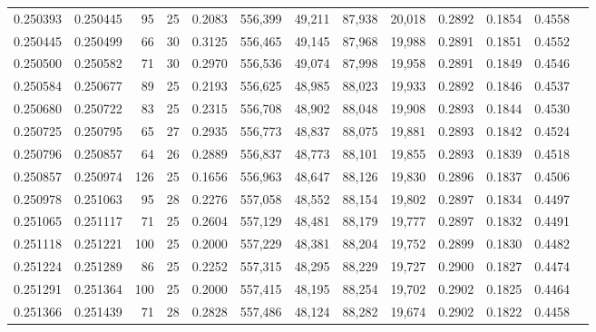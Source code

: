 \begin{tabular}{rrrrrrrrrrrrr}
0.250393 & 0.250445 &  95 &  25 &                                     0.2083 & 556,399 &  49,211 &  87,938 &  20,018 & 0.2892 & 0.1854 & 0.4558 \\
0.250445 & 0.250499 &  66 &  30 &                                     0.3125 & 556,465 &  49,145 &  87,968 &  19,988 & 0.2891 & 0.1851 & 0.4552 \\
0.250500 & 0.250582 &  71 &  30 &                                     0.2970 & 556,536 &  49,074 &  87,998 &  19,958 & 0.2891 & 0.1849 & 0.4546 \\
0.250584 & 0.250677 &  89 &  25 &                                     0.2193 & 556,625 &  48,985 &  88,023 &  19,933 & 0.2892 & 0.1846 & 0.4537 \\
0.250680 & 0.250722 &  83 &  25 &                                     0.2315 & 556,708 &  48,902 &  88,048 &  19,908 & 0.2893 & 0.1844 & 0.4530 \\
0.250725 & 0.250795 &  65 &  27 &                                     0.2935 & 556,773 &  48,837 &  88,075 &  19,881 & 0.2893 & 0.1842 & 0.4524 \\
0.250796 & 0.250857 &  64 &  26 &                                     0.2889 & 556,837 &  48,773 &  88,101 &  19,855 & 0.2893 & 0.1839 & 0.4518 \\
0.250857 & 0.250974 & 126 &  25 &                                     0.1656 & 556,963 &  48,647 &  88,126 &  19,830 & 0.2896 & 0.1837 & 0.4506 \\
0.250978 & 0.251063 &  95 &  28 &                                     0.2276 & 557,058 &  48,552 &  88,154 &  19,802 & 0.2897 & 0.1834 & 0.4497 \\
0.251065 & 0.251117 &  71 &  25 &                                     0.2604 & 557,129 &  48,481 &  88,179 &  19,777 & 0.2897 & 0.1832 & 0.4491 \\
0.251118 & 0.251221 & 100 &  25 &                                     0.2000 & 557,229 &  48,381 &  88,204 &  19,752 & 0.2899 & 0.1830 & 0.4482 \\
0.251224 & 0.251289 &  86 &  25 &                                     0.2252 & 557,315 &  48,295 &  88,229 &  19,727 & 0.2900 & 0.1827 & 0.4474 \\
0.251291 & 0.251364 & 100 &  25 &                                     0.2000 & 557,415 &  48,195 &  88,254 &  19,702 & 0.2902 & 0.1825 & 0.4464 \\
0.251366 & 0.251439 &  71 &  28 &                                     0.2828 & 557,486 &  48,124 &  88,282 &  19,674 & 0.2902 & 0.1822 & 0.4458 \\

\end{tabular}

